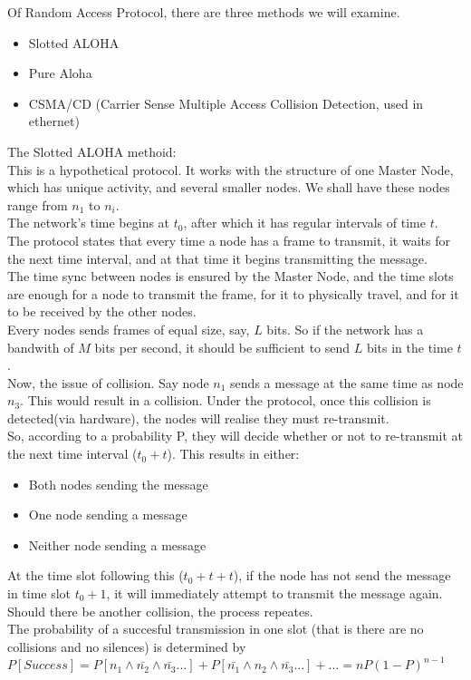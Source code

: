 \documentclass{article}
\begin{document}
Of Random Access Protocol, there are three methods we will examine.\\
\begin{itemize}
\item Slotted ALOHA
\item Pure Aloha
\item CSMA/CD (Carrier Sense Multiple Access Collision Detection, used in ethernet)
\end{itemize}
The Slotted ALOHA methoid:\\
This is a hypothetical protocol. It works with the structure of one Master Node, which has unique activity, and several smaller nodes. We shall have these nodes range from $n_1$ to $n_i$.\\
The network's time begins at $t_0$, after which it has regular intervals of time $t$. The protocol states that every time a node has a frame to transmit, it waits for the next time interval, and at that time it begins transmitting the message.\\
The time sync between nodes is ensured by the Master Node, and the time slots are enough for a node to transmit the frame, for it to physically travel, and for it to be received by the other nodes.\\
Every nodes sends frames of equal size, say, $L$ bits. So if the network has a bandwith of $M$ bits per second, it should be sufficient to send $L$ bits in the time $t$.\\
Now, the issue of collision. Say node $n_1$ sends a message at the same time as node $n_3$. This would result in a collision. Under the protocol, once this collision is detected(via hardware), the nodes will realise they must re-transmit.\\
So, according to a probability P, they will decide whether or not to re-transmit at the next time interval ($t_0 + t$). This results in either:
\begin{itemize}
\item Both nodes sending the message
\item One node sending a message
\item Neither node sending a message
\end{itemize}
At the time slot following this ($t_0 +t+t$), if the node has not send the message in time slot $t_0 + 1$, it will immediately attempt to transmit the message again. Should there be another collision, the process repeates.\\
The probability of a succesful transmission in one slot (that is there are no collisions and no silences) is determined by $P[Success] = P[n_1 \land \bar{n_2} \land \bar{n_3} ...] + P[\bar{n_1} \land n_2 \land \bar{n_3} ...] + ... = nP(1-P)^{n-1}$\\
\end{document}
